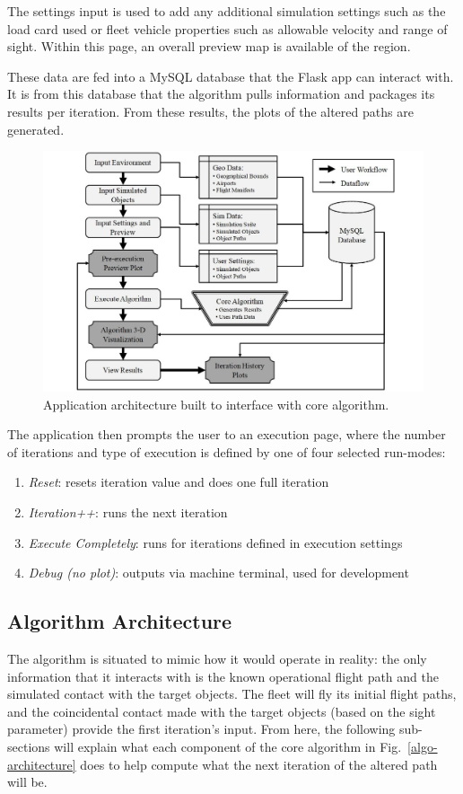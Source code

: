 \documentclass[conf]{new-aiaa}
\begin{document}
The settings input is used to add any additional simulation settings such as the load card used or fleet vehicle properties such as allowable velocity and range of sight. Within this page, an overall preview map is available of the region.

These data are fed into a MySQL database that the Flask app can interact with. It is from this database that the algorithm pulls information and packages its results per iteration. From these results, the plots of the altered paths are generated.

\begin{figure}[hbt!]
\centering
\includegraphics[width=1\textwidth]{figs/app-architecture}
\caption{Application architecture built to interface with core algorithm.}
\label{app-architecture}
\end{figure}

The application then prompts the user to an execution page, where the number of iterations and type of execution is defined by one of four selected run-modes:
\begin{enumerate}
\item \emph{Reset}: resets iteration value and does one full iteration
\item \emph{Iteration++}: runs the next iteration
\item \emph{Execute Completely}: runs for iterations defined in execution settings
\item \emph{Debug (no plot)}: outputs via machine terminal, used for development
\end{enumerate}

\subsection{Algorithm Architecture}
The algorithm is situated to mimic how it would operate in reality: the only information that it interacts with is the known operational flight path and the simulated contact with the target objects. The fleet will fly its initial flight paths, and the coincidental contact made with the target objects (based on the sight parameter) provide the first iteration's input. From here, the following sub-sections will explain what each component of the core algorithm in Fig.~\ref{algo-architecture} does to help compute what the next iteration of the altered path will be.
\end{document}
